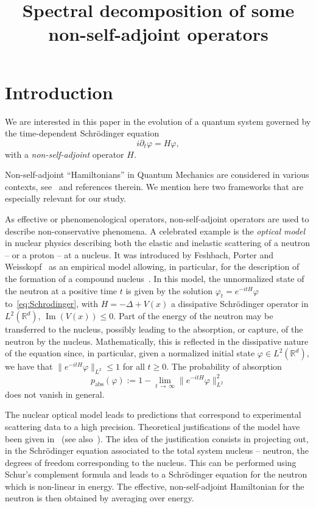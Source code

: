 \documentclass[AHL,Unicode,longabstracts,published]{cedram}
\title[Spectral decomposition of some non-self-adjoint operators]{Spectral decomposition of some non-self-adjoint operators}
\author[\initial{J.} \lastname{Faupin}]{\firstname{Jérémy} \lastname{Faupin}}
\author[\initial{N.} \lastname{Frantz}]{\firstname{Nicolas} \lastname{Frantz}}
\newcommand{\R}{\mathbb{R}}
\newcommand{\abs}{\mathrm{abs}}
\DeclareMathOperator{\im}{Im}
\newcommand{\R}{\mathbb{R}}
\DeclareMathOperator{\im}{Im}
\begin{document}
\maketitle
\setcounter{tocdepth}{2}
\tableofcontents


\section{Introduction}

We are interested in this paper in the evolution of a quantum system governed by the time-dependent Schr\"odinger equation
\begin{equation}\label{eq:Schrodinger}
i\partial_t \varphi = H \varphi, 
\end{equation}
with a \emph{non-self-adjoint} operator $H$.

Non-self-adjoint ``Hamiltonians'' in Quantum Mechanics are considered in various contexts, see~\cite{Ba15_01,Kr17_01} and references therein. We mention here two frameworks that are especially relevant for our study.

As effective or phenomenological operators, non-self-adjoint operators are used to describe non-conservative phenomena. A celebrated example is the \emph{optical model} in nuclear physics describing both the elastic and inelastic scattering of a neutron -- or a proton -- at a nucleus. It was introduced by Feshbach, Porter and Weisskopf~\cite{FePoWe54_01} as an empirical model allowing, in particular, for the description of the formation of a compound nucleus~\cite{Bo36_01}. In this model, the unnormalized state of the neutron at a positive time $t$ is given by the solution $\varphi_t=e^{-itH}\varphi$ to~\eqref{eq:Schrodinger}, with $H = - \Delta + V(x)$ a dissipative Schr\"odinger operator in $L^2(\R^d)$, $\im(V(x))\le0$. Part of the energy of the neutron may be transferred to the nucleus, possibly leading to the absorption, or capture, of the neutron by the nucleus. Mathematically, this is reflected in the dissipative nature of the equation since, in particular, given a normalized initial state $\varphi\in L^2(\R^d)$, we have that $\|e^{-itH}\varphi\|_{L^2}\le 1$ for all $t\ge0$. The probability of absorption
\begin{equation*}
p_{\abs}(\varphi):=1-\lim_{t\,\to\,\infty}\big\|e^{-itH}\varphi\big\|_{L^2}^2
\end{equation*}
does not vanish in general.

The nuclear optical model leads to predictions that correspond to experimental scattering data to a high precision. Theoretical justifications of the model have been given in~\cite{Fe58_02,Fe58_01,Fe62_01} (see also~\cite{Ba15_01,Fe92_01,Ho71_01}). The idea of the justification consists in projecting out, in the Schr\"odinger equation associated to the total system nucleus -- neutron, the degrees of freedom corresponding to the nucleus. This can be performed using Schur's complement formula and leads to a Schr\"odinger equation for the neutron which is non-linear in energy. The effective, non-self-adjoint Hamiltonian for the neutron is then obtained by averaging over energy.
\end{document}
